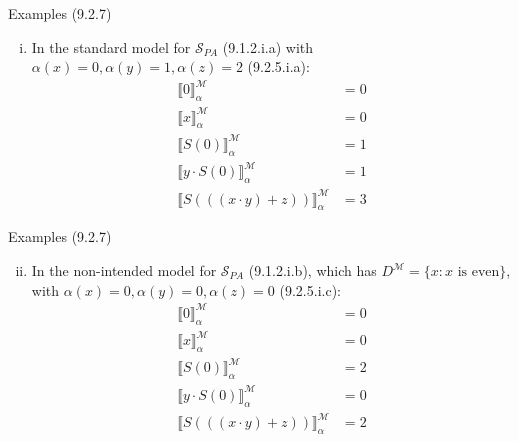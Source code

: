 \begin{frame}{Examples (9.2.7)}

\begin{enumerate}[(i)]
		
			\item In the standard model for $\mathcal{S}_{PA}$ (9.1.2.i.a) with $\alpha(x)=0,\alpha(y)=1,\alpha(z)=2$ (9.2.5.i.a):
			\begin{align*}
			\llbracket 0\rrbracket^\mathcal{M}_\alpha&=0\\
			\llbracket x\rrbracket^\mathcal{M}_\alpha&=0\\
			\llbracket S(0)\rrbracket^\mathcal{M}_\alpha&=1\\
			\llbracket y\cdot S(0)\rrbracket^\mathcal{M}_\alpha&=1\\
			\llbracket S(((x\cdot y)+z))\rrbracket^\mathcal{M}_\alpha&=3
			\end{align*}
			
			
\end{enumerate}
\end{frame}
\begin{frame}{Examples (9.2.7)}

\begin{enumerate}[(i)]
\setcounter{enumi}{1}			
			\item In the non-intended model for $\mathcal{S}_{PA}$ (9.1.2.i.b), which has $D^\mathcal{M}=\{x:x\text{ is even}\}$, with $\alpha(x)=0,\alpha(y)=0,\alpha(z)=0$ (9.2.5.i.c):
			\begin{align*}
			\llbracket 0\rrbracket^\mathcal{M}_\alpha&=0\\
			\llbracket x\rrbracket^\mathcal{M}_\alpha&=0\\
			\llbracket S(0)\rrbracket^\mathcal{M}_\alpha&=2\\
			\llbracket y\cdot S(0)\rrbracket^\mathcal{M}_\alpha&=0\\
			\llbracket S(((x\cdot y)+z))\rrbracket^\mathcal{M}_\alpha&=2
			\end{align*}
			
	\end{enumerate}
\end{frame}
